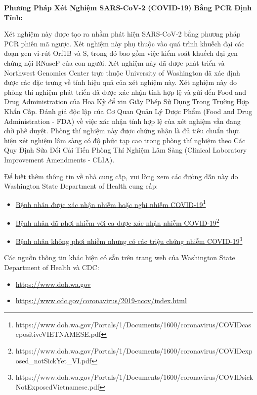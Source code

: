\documentclass[10pt]{article}
\newcommand{\link}[2]{\href{#1}{#2}\footnote{#1}}
\begin{document}
\bigskip
\textbf{Phương Pháp Xét Nghiệm SARS-CoV-2 (COVID-19) Bằng PCR Định Tính:}

Xét nghiệm này được tạo ra nhằm phát hiện SARS-CoV-2 bằng phương pháp PCR phiên
mã ngược. Xét nghiệm này phụ thuộc vào quá trình khuếch đại các đoạn gen vi-rút
Orf1B và S, trong đó bao gồm việc kiểm soát khuếch đại gen chứng nội RNaseP của
con người. Xét nghiệm này đã được phát triển và Northwest Genomics Center trực
thuộc University of Washington đã xác định được các đặc trưng về tính hiệu quả
của xét nghiệm này. Xét nghiệm này do phòng thí nghiệm phát triển đã được xác
nhận tính hợp lệ và gửi đến Food and Drug Administration của Hoa Kỳ để xin Giấy
Phép Sử Dụng Trong Trường Hợp Khẩn Cấp. Đánh giá độc lập của Cơ Quan Quản Lý
Dược Phẩm (Food and Drug Administration - FDA) về việc xác nhận tính hợp lệ của
xét nghiệm vẫn đang chờ phê duyệt. Phòng thí nghiệm này được chứng nhận là đủ
tiêu chuẩn thực hiện xét nghiệm lâm sàng có độ phức tạp cao trong phòng thí
nghiệm theo Các Quy Định Sửa Đổi Cải Tiến Phòng Thí Nghiệm Lâm Sàng (Clinical
Laboratory Improvement Amendments - CLIA).

Để biết thêm thông tin về nhà cung cấp, vui lòng xem các đường dẫn này do
Washington State Department of Health cung cấp:

\begin{itemize}
\item

  \link{https://www.doh.wa.gov/Portals/1/Documents/1600/coronavirus/COVIDcasepositiveVIETNAMESE.pdf}{Bệnh
  nhân được xác nhận nhiễm hoặc nghi nhiễm COVID-19}

\item

  \link{https://www.doh.wa.gov/Portals/1/Documents/1600/coronavirus/COVIDexposed\_notSickYet\_VI.pdf}{Bệnh
  nhân đã phơi nhiễm với ca được xác nhận nhiễm COVID-19}

\item

  \link{https://www.doh.wa.gov/Portals/1/Documents/1600/coronavirus/COVIDsickNotExposedVietnamese.pdf}{Bệnh
  nhân không phơi nhiễm nhưng có các triệu chứng nhiễm COVID-19}

\end{itemize}

Các nguồn thông tin khác hiện có sẵn trên trang web của Washington State
Department of Health và CDC:

\begin{itemize}
\item

  \url{https://www.doh.wa.gov}

\item

  \url{https://www.cdc.gov/coronavirus/2019-ncov/index.html}

\end{itemize}
\end{document}
